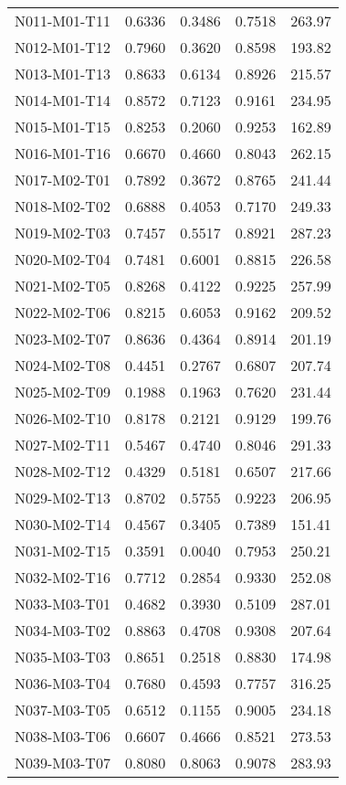 \begin{longtable}[c]{|p{8cm}|c|l|l|l|}
N011-M01-T11 & 0.6336 & 0.3486 & 0.7518 & 263.97 \\
N012-M01-T12 & 0.7960 & 0.3620 & 0.8598 & 193.82 \\
N013-M01-T13 & 0.8633 & 0.6134 & 0.8926 & 215.57 \\
N014-M01-T14 & 0.8572 & 0.7123 & 0.9161 & 234.95 \\
N015-M01-T15 & 0.8253 & 0.2060 & 0.9253 & 162.89 \\
N016-M01-T16 & 0.6670 & 0.4660 & 0.8043 & 262.15 \\
N017-M02-T01 & 0.7892 & 0.3672 & 0.8765 & 241.44 \\
N018-M02-T02 & 0.6888 & 0.4053 & 0.7170 & 249.33 \\
N019-M02-T03 & 0.7457 & 0.5517 & 0.8921 & 287.23 \\
N020-M02-T04 & 0.7481 & 0.6001 & 0.8815 & 226.58 \\
N021-M02-T05 & 0.8268 & 0.4122 & 0.9225 & 257.99 \\
N022-M02-T06 & 0.8215 & 0.6053 & 0.9162 & 209.52 \\
N023-M02-T07 & 0.8636 & 0.4364 & 0.8914 & 201.19 \\
N024-M02-T08 & 0.4451 & 0.2767 & 0.6807 & 207.74 \\
N025-M02-T09 & 0.1988 & 0.1963 & 0.7620 & 231.44 \\
N026-M02-T10 & 0.8178 & 0.2121 & 0.9129 & 199.76 \\
N027-M02-T11 & 0.5467 & 0.4740 & 0.8046 & 291.33 \\
N028-M02-T12 & 0.4329 & 0.5181 & 0.6507 & 217.66 \\
N029-M02-T13 & 0.8702 & 0.5755 & 0.9223 & 206.95 \\
N030-M02-T14 & 0.4567 & 0.3405 & 0.7389 & 151.41 \\
N031-M02-T15 & 0.3591 & 0.0040 & 0.7953 & 250.21 \\
N032-M02-T16 & 0.7712 & 0.2854 & 0.9330 & 252.08 \\
N033-M03-T01 & 0.4682 & 0.3930 & 0.5109 & 287.01 \\
N034-M03-T02 & 0.8863 & 0.4708 & 0.9308 & 207.64 \\
N035-M03-T03 & 0.8651 & 0.2518 & 0.8830 & 174.98 \\
N036-M03-T04 & 0.7680 & 0.4593 & 0.7757 & 316.25 \\
N037-M03-T05 & 0.6512 & 0.1155 & 0.9005 & 234.18 \\
N038-M03-T06 & 0.6607 & 0.4666 & 0.8521 & 273.53 \\
N039-M03-T07 & 0.8080 & 0.8063 & 0.9078 & 283.93 \\

\end{longtable}

